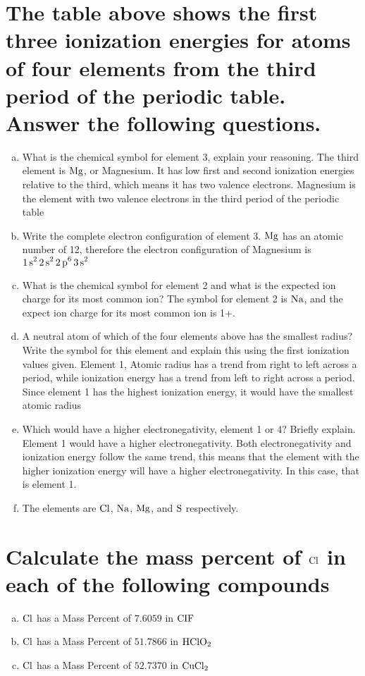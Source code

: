 \documentclass[11pt]{article}
\begin{document}
\section{The table above shows the first three ionization energies for atoms of four elements from the third period of the periodic table. Answer the following questions.}
\label{sec:orgbc1ffb4}
\begin{enumerate}[(a)]
\item What is the chemical symbol for element 3, explain your reasoning.
The third element is \(\ce{Mg}\), or Magnesium. It has low first and second ionization energies relative to the third, which means it has two valence electrons. Magnesium is the element with two valence electrons in the third period of the periodic table

\item Write the complete electron configuration of element 3.
\(\ce{Mg}\) has an atomic number of 12, therefore the electron configuration of Magnesium is \(\ce{1s^2 2s^2 2p^6 3s^2}\)

\item What is the chemical symbol for element 2 and what is the expected ion charge for its most common ion?
The symbol for element 2 is \(\ce{Na}\), and the expect ion charge for its most common ion is 1+.

\item A neutral atom of which of the four elements above has the smallest radius? Write the symbol for this element and explain this using the first ionization values given.
Element 1, Atomic radius has a trend from right to left across a period, while ionization energy has a trend from left to right across a period. Since element 1 has the highest ionization energy, it would have the smallest atomic radius

\item Which would have a higher electronegativity, element 1 or 4? Briefly explain.
Element 1 would have a higher electronegativity. Both electronegativity and ionization energy follow the same trend, this means that the element with the higher ionization energy will have a higher electronegativity. In this case, that is element 1.

\item The elements are \(\ce{Cl}\), \(\ce{Na}\), \(\ce{Mg}\), and \(\ce{S}\) respectively.
\end{enumerate}

\section{Calculate the mass percent of \(\ce{Cl}\) in each of the following compounds}
\label{sec:org6fe1951}
\begin{enumerate}[(a)]
\item \(\ce{Cl}\)  has a Mass Percent of \(7.6059\) in \(\ce{CIF}\)
\item \(\ce{Cl}\)  has a Mass Percent of \(51.7866\) in \(\ce{HClO2}\)
\item \(\ce{Cl}\)  has a Mass Percent of \(52.7370\) in \(\ce{CuCl2}\)
\end{enumerate}
\end{document}
